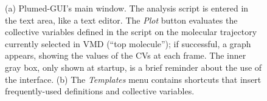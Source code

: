 \documentclass[preprint,review,11pt]{elsarticle}
\begin{document}
\begin{figure}
  \centering
  \caption{(a) Plumed-GUI's main window.  The analysis script is
    entered in the text area, like a text editor. The \emph{Plot}
    button evaluates the collective variables defined in the script on
    the molecular trajectory currently selected in VMD (``top
    molecule''); if successful, a graph appears, showing the values of
    the CVs at each frame. The inner gray box, only shown at
    startup, is a brief reminder about the use of the interface. (b)
    The \emph{Templates} menu contains shortcuts that insert
    frequently-used definitions and collective variables. }
\end{figure}
\end{document}
